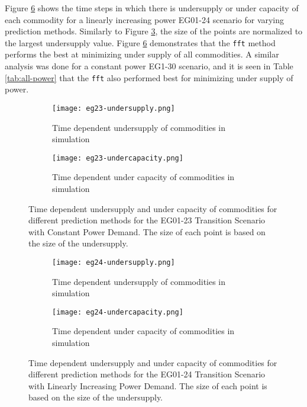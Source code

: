 Figure \ref{fig:eg24under} shows the time steps in which there is undersupply 
or under capacity of each commodity for a linearly increasing power EG01-24 
scenario for varying prediction methods.
Similarly to Figure \ref{fig:eg23under}, the size of the points are normalized 
to the largest undersupply value. 
Figure \ref{fig:eg24under} demonstrates that the \texttt{fft} method 
performs the best at minimizing under supply of all commodities.
A similar analysis was done for a constant power EG1-30 scenario, and 
it is seen in Table \ref{tab:all-power} that the \texttt{fft} also performed 
best for minimizing under supply of power. 

\begin{figure}[]
	\centering
	\begin{subfigure}[t]{1.2\textwidth}
		\centering
		\texttt{[image: eg23-undersupply.png]} 
		\caption{Time dependent undersupply of commodities in simulation }
		\label{fig:23undersupply}
	\end{subfigure}
	\vspace{1cm}
	\begin{subfigure}[t]{1.2\textwidth}
		\centering
		\texttt{[image: eg23-undercapacity.png]} 
		\caption{Time dependent under capacity of commodities in simulation }
		\label{fig:23undercapacity}
	\end{subfigure}
	\hfill
	\caption{Time dependent undersupply and under capacity of commodities 
	for different prediction methods for the 
	EG01-23 Transition Scenario with Constant Power Demand.
	The size of each point is based on the size of the undersupply.}
	\label{fig:eg23under}
\end{figure}

\begin{figure}[]
	\centering
	\begin{subfigure}[t]{1.2\textwidth}
		\centering
		\texttt{[image: eg24-undersupply.png]} 
		\caption{Time dependent undersupply of commodities in simulation }
		\label{fig:24undersupply}
	\end{subfigure}
	\vspace{1cm}
	\begin{subfigure}[t]{1.2\textwidth}
		\centering
		\texttt{[image: eg24-undercapacity.png]} 
		\caption{Time dependent under capacity of commodities in simulation }
		\label{fig:24undercapacity}
	\end{subfigure}
	\hfill
	\caption{Time dependent undersupply and under capacity of commodities 
	for different prediction methods for the 
	EG01-24 Transition Scenario with Linearly Increasing Power Demand.
	The size of each point is based on the size of the undersupply.}
	\label{fig:eg24under}
\end{figure}

